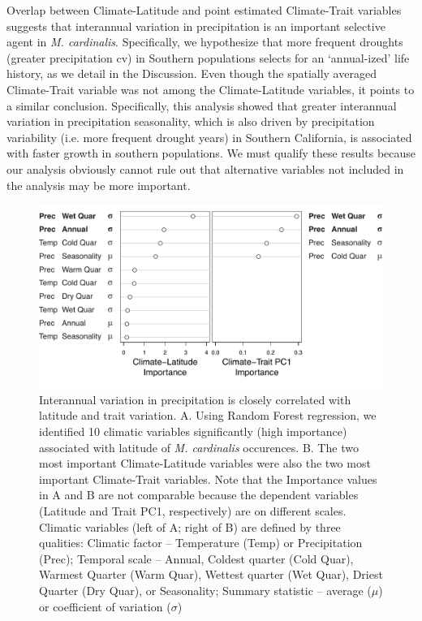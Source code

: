 \documentclass[11pt, oneside]{article}
\begin{document}
Overlap between Climate-Latitude and point estimated Climate-Trait variables suggests that interannual variation in precipitation is an important selective agent in \textit{M. cardinalis}. Specifically, we hypothesize that more frequent droughts (greater precipitation cv) in Southern populations selects for an `annual-ized' life history, as we detail in the Discussion. Even though the spatially averaged Climate-Trait variable was not among the Climate-Latitude variables, it points to a similar conclusion. Specifically, this analysis showed that greater interannual variation in precipitation seasonality, which is also driven by precipitation variability (i.e. more frequent drought years) in Southern California, is associated with faster growth in southern populations. We must qualify these results because our analysis obviously cannot rule out that alternative variables not included in the analysis may be more important.


\begin{figure}[h!]
	\centerline{\includegraphics[width=1\textwidth]{Figures/Figure_ClimVarImp.pdf}}
	\fontsize{10}{12}
	\selectfont
	\caption[Interannual variation in precipitation is closely correlated with latitude and trait variation]{Interannual variation in precipitation is closely correlated with latitude and trait variation. A. Using Random Forest regression, we identified 10 climatic variables significantly (high importance) associated with latitude of \textit{M. cardinalis} occurences. B. The two most important Climate-Latitude variables were also the two most important Climate-Trait variables. Note that the Importance values in A and B are not comparable because the dependent variables (Latitude and Trait PC1, respectively) are on different scales. Climatic variables (left of A; right of B) are defined by three qualities: Climatic factor -- Temperature (Temp) or Precipitation (Prec); Temporal scale -- Annual, Coldest quarter (Cold Quar), Warmest Quarter (Warm Quar), Wettest quarter (Wet Quar), Driest Quarter (Dry Quar), or Seasonality; Summary statistic -- average ($\mu$) or coefficient of variation ($\sigma$)}
	\label{fig:Fig_ClimVarImp}
\end{figure}
\end{document}
